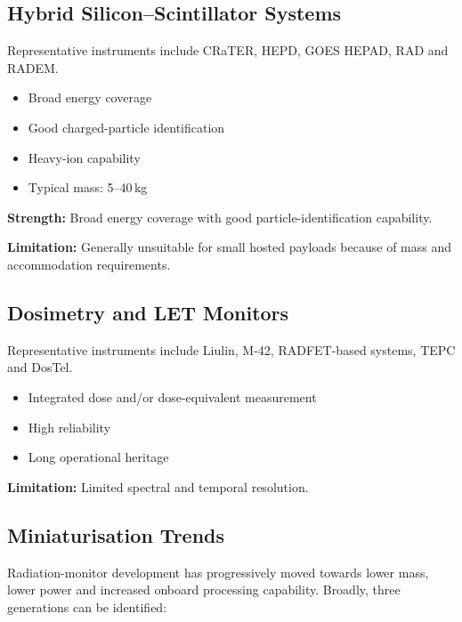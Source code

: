 \subsection{Hybrid Silicon--Scintillator Systems}

Representative instruments include CRaTER, HEPD, GOES HEPAD, RAD and RADEM.

\begin{itemize}[noitemsep]
\item Broad energy coverage
\item Good charged-particle identification
\item Heavy-ion capability
\item Typical mass: 5--40\,kg
\end{itemize}

\textbf{Strength:} Broad energy coverage with good particle-identification capability.

\textbf{Limitation:} Generally unsuitable for small hosted payloads because of mass and accommodation requirements.


\subsection{Dosimetry and LET Monitors}

Representative instruments include Liulin, M-42, RADFET-based systems, TEPC and DosTel.

\begin{itemize}[noitemsep]
\item Integrated dose and/or dose-equivalent measurement
\item High reliability
\item Long operational heritage
\end{itemize}

\textbf{Limitation:} Limited spectral and temporal resolution.


\subsection{Miniaturisation Trends}

Radiation-monitor development has progressively moved towards lower mass, lower power and increased onboard processing capability. Broadly, three generations can be identified:

